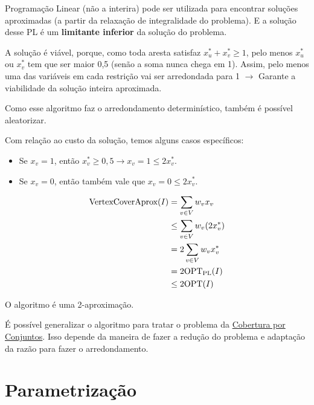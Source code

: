 Programação Linear (não a interira) pode ser utilizada para encontrar soluções aproximadas (a partir da relaxação de integralidade do problema). E a solução desse PL é um \textbf{limitante inferior} da solução do problema.

\begin{algorithm}
	\SetAlgoLined
\end{algorithm}

A solução é viável, porque, como toda aresta satisfaz $x_u^* + x_v^* \geq 1$, pelo menos $x_u^*$ ou $x_v^*$ tem que ser maior 0,5 (senão a soma nunca chega em 1). Assim, pelo menos uma das variáveis em cada restrição vai ser arredondada para 1 $\rightarrow$ Garante a viabilidade da solução inteira aproximada.

Como esse algoritmo faz o arredondamento determinístico, também é possível aleatorizar.

Com relação ao custo da solução, temos alguns casos específicos:

\begin{itemize}
	\item Se $x_v = 1$, então $x_v^* \geq 0,5 \rightarrow x_v = 1 \leq 2x_v^*$.
	\item Se $x_v = 0$, então também vale que $x_v = 0 \leq 2x_v^*$.
\end{itemize}

\begin{align*}
	\text{\lstinline{VertexCoverAprox}}(I) & = \sum_{v \in V}w_vx_v\\
	  & \leq \sum_{v \in V}w_v(2x_v^*)    \\
	  & = 2 \sum_{v \in V}  w_vx_v^*      \\
	  & = 2 \mathrm{OPT}_{\mathrm{PL}}(I) \\
	  & \leq 2\mathrm{OPT}(I)
\end{align*}

O algoritmo é uma 2-aproximação.

É possível generalizar o algoritmo para tratar o problema da \hyperref[sec:cobertura_conjuntos]{Cobertura por Conjuntos}. Isso depende da maneira de fazer a redução do problema e adaptação da razão para fazer o arredondamento.

\section{Parametrização}

